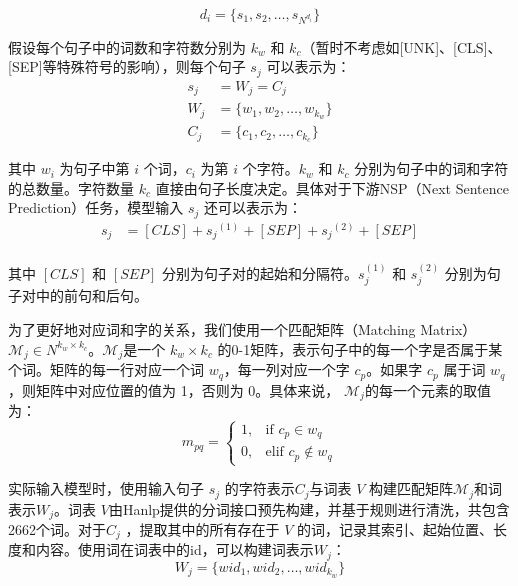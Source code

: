\documentclass[12pt, a4paper]{ctexart}
\begin{document}
\begin{equation}
   d_i = \{s_1, s_2, \dots, s_{N^{d_i}}\} 
\end{equation}

假设每个句子中的词数和字符数分别为 $k_w$ 和 $k_c$（暂时不考虑如[UNK]、[CLS]、[SEP]等特殊符号的影响），则每个句子 $s_j$ 可以表示为：
\begin{equation}
    \begin{split}
        s_j &= W_j = C_j \\
        W_j &= \{w_1, w_2, \dots, w_{k_w}\} \\
        C_j &= \{c_1, c_2, \dots, c_{k_c}\}
    \end{split}
\end{equation}

其中 $w_i$ 为句子中第 $i$ 个词，$c_i$ 为第 $i$ 个字符。$k_w$ 和 $k_c$ 分别为句子中的词和字符的总数量。字符数量 $k_c$ 直接由句子长度决定。具体对于下游NSP（Next Sentence Prediction）任务，模型输入 $s_j$ 还可以表示为：
\begin{equation}
    \begin{split}
        s_j &= [CLS] + {s_j}^{(1)} + [SEP] + {s_j}^{(2)} + [SEP] \\
    \end{split}
\end{equation} 

其中 $[CLS]$ 和 $[SEP]$ 分别为句子对的起始和分隔符。$s_j^{(1)}$ 和 $s_j^{(2)}$ 分别为句子对中的前句和后句。

为了更好地对应词和字的关系，我们使用一个匹配矩阵（Matching Matrix）${\mathcal{M}}_j  \in N^{k_w \times k_c}$。${\mathcal{M}}_j$是一个 $k_w \times k_c$ 的0-1矩阵，表示句子中的每一个字是否属于某个词。矩阵的每一行对应一个词 $w_q$，每一列对应一个字 $c_p$。如果字 $c_p$ 属于词 $w_q$，则矩阵中对应位置的值为 1，否则为 0。具体来说，
$ {\mathcal{M}}_j$的每一个元素的取值为：
\begin{equation}
    m_{pq} = \begin{cases}
        1, & \text{if } c_p \in w_q \\
        0, & \text{elif } c_p \notin w_q
    \end{cases}
    \label{eq:matching_matrix}
\end{equation}

实际输入模型时，使用输入句子 $s_j$ 的字符表示$C_j$与词表 $V$ 构建匹配矩阵${\mathcal{M}}_j$和词表示$W_j$。词表 $V$由Hanlp提供的分词接口预先构建，并基于规则进行清洗，共包含2662个词。对于$C_j$ ，提取其中的所有存在于 $V$ 的词，记录其索引、起始位置、长度和内容。使用词在词表中的id，可以构建词表示$W_j$：
\begin{equation}
    W_j = \{wid_1, wid_2, \dots, wid_{k_w}\}
\end{equation}
\end{document}
